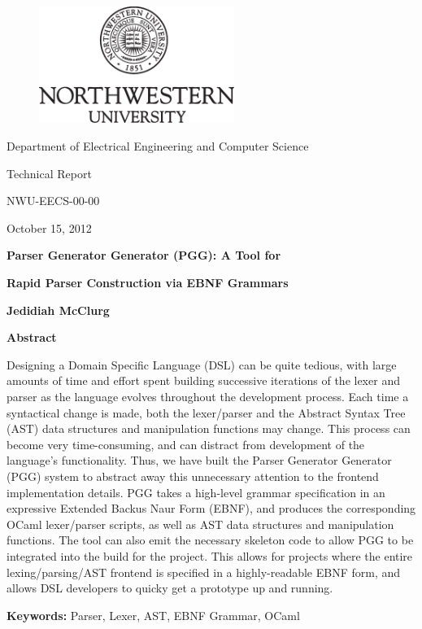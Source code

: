 \documentclass{article}
\begin{document}
\vspace{-3.0in}
\begin{figure}
\centering
\includegraphics[width=2.5in]{nwu}
\end{figure}

%
\centerline{\Large Department of Electrical Engineering and Computer Science}
\vspace{0.2in}

\centerline{\Large { Technical Report}}
\vspace{0.05in}
\centerline{\Large { NWU-EECS-00-00}}
\vspace{0.05in}
\centerline{\Large { October 15, 2012}}
\vspace{0.3in}

\centerline{\Large {\bf Parser Generator Generator (PGG): A Tool for}}
\centerline{\Large {\bf Rapid Parser Construction via EBNF Grammars}}
\vspace{0.3in}
\centerline{\large {\bf Jedidiah McClurg}}
\vspace{0.8in}

\centerline{\large {\bf Abstract}}
\vspace{0.15in}
Designing a Domain Specific Language (DSL) can be quite tedious,
with large amounts of time and effort spent building successive
iterations of the lexer and parser as the language evolves
throughout the development process.
Each time a syntactical change is made, both the lexer/parser and
the Abstract Syntax Tree (AST) data structures and manipulation
functions may change.  This process can become very
time-consuming, and can distract from development of the
language's functionality.  Thus, we have built the Parser
Generator Generator (PGG) system to abstract away this unnecessary
attention to the frontend implementation details.  PGG takes a high-level
grammar specification in an expressive Extended Backus Naur Form (EBNF),
and produces the corresponding OCaml lexer/parser scripts, as
well as AST data structures and manipulation functions.  The
tool can also emit the necessary skeleton code to allow
PGG to be integrated into the build for the project.  This
allows for projects where the entire lexing/parsing/AST
frontend is specified in a highly-readable EBNF form,
and allows DSL developers to quicky get a prototype up and running.

\vspace{0.5in}
{\bf Keywords:} Parser, Lexer, AST, EBNF Grammar, OCaml
\end{document}
